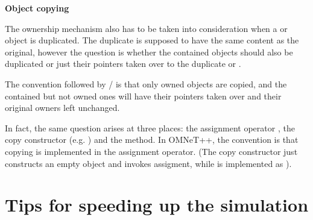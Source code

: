\textbf{Object copying}

The ownership mechanism also has to be taken into consideration
when a  or  object is duplicated.
The duplicate is supposed to have the same content as the
original, however the question is whether the contained objects
should also be duplicated or just their pointers taken over
to the duplicate  or .

The convention followed by / is that
only owned objects are copied, and the contained but not owned ones
will have their pointers taken over and their original owners
left unchanged.

In fact, the same question arises at three places:
the assignment operator , the copy constructor
(e.g. ) and the  method.
In OMNeT++, the convention is that copying is implemented
in the assignment operator. (The copy constructor just constructs
an empty object and invokes assigment, while 
is implemented as ).

%
%
%
%
%
%
%
%
%


\section{Tips for speeding up the simulation}

